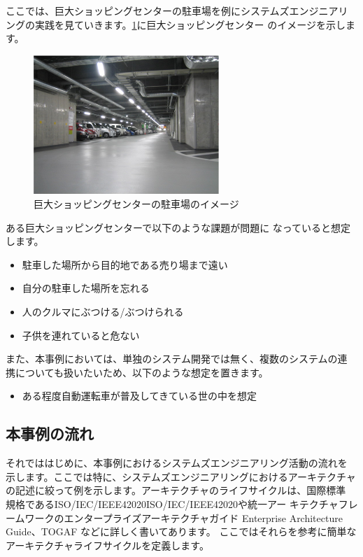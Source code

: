 ここでは、巨大ショッピングセンターの駐車場を例にシステムズエンジニアリ
ングの実践を見ていきます。\ref{figure:ch4-6}に巨大ショッピングセンター
のイメージを示します。
\begin{figure}
    \begin{center}
    \includegraphics[width=70mm]{safety_assurance_contents/ch4images/fig6.png}
    \caption{巨大ショッピングセンターの駐車場のイメージ}
    \label{figure:ch4-6}
    \end{center}
\end{figure}
ある巨大ショッピングセンターで以下のような課題が問題に
なっていると想定します。
\begin{itemize}
\item
  駐車した場所から目的地である売り場まで遠い
\item
  自分の駐車した場所を忘れる
\item
  人のクルマにぶつける/ぶつけられる
\item
  子供を連れていると危ない
\end{itemize}
また、本事例においては、単独のシステム開発では無く、複数のシステムの連
携についても扱いたいため、以下のような想定を置きます。
\begin{itemize}
\item
  ある程度自動運転車が普及してきている世の中を想定
\end{itemize}
\subsection{本事例の流れ}
それでははじめに、本事例におけるシステムズエンジニアリング活動の流れを
示します。ここでは特に、システムズエンジニアリングにおけるアーキテクチャ
の記述に絞って例を示します。アーキテクチャのライフサイクルは、国際標準
規格であるISO/IEC/IEEE42020\lbrack ISO/IEC/IEEE42020\rbrack や統一アー
キテクチャフレームワークのエンタープライズアーキテクチャガイド\lbrack
Enterprise Architecture Guide\rbrack、TOGAF などに詳しく書いてあります。
ここではそれらを参考に簡単なアーキテクチャライフサイクルを定義します。

